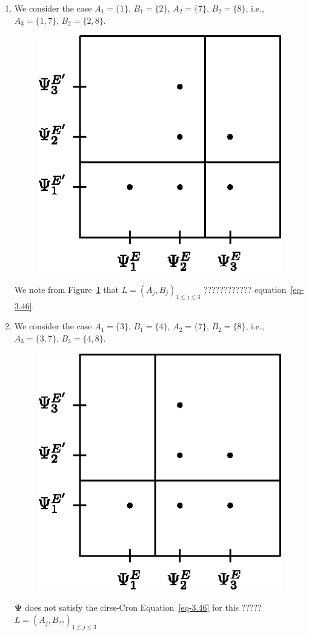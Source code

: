 \documentclass[a4paper,12pt]{article}
\theoremstyle{definition}
\theoremstyle{underlinethm}
\theoremstyle{definition}
\begin{document}

\begin{enumerate}[label=(\alph*)]

\item  We consider the case $A_{1} = \{1\}$, $B_{1}=\{2\}$, $A_{2} = \{7\}$, $B_{2} = \{8\}$, i.e., $A_{3}= \{1,7\}$, $B_{2} = \{2,8\}$.

\begin{figure}[h]
\centering
\includegraphics[scale=.9]{figure/figures/fig14.eps}
\caption{}\label{fig14}
\end{figure} 

We note from Figure~\ref{fig14} that $L=(A_{j}, B_{j})_{1 \leq j \leq 3}$ ???????????? equation~\eqref{eq-3.46}.

\newpage

\item We consider the case $A_{1} = \{3\}$, $B_{1} = \{4\}$, $A_{2} = \{7\}$, $B_{2}=\{8\}$, i.e., $A_{3} = \{3,7\}$, $B_{3}= \{4,8\}$.
\begin{figure}[h]
\centering
\includegraphics[scale=.9]{figure/figures/fig15.eps}
\caption{}\label{fig15}
\end{figure} 
$\boldsymbol{\Psi}$ does not satisfy the cirss-Cron Equation~\eqref{eq-3.46} for this ????? $L = \left(A_{j}, B_{??}\right)_{1 \leq j \leq 3}$


\end{enumerate}
\end{document}
